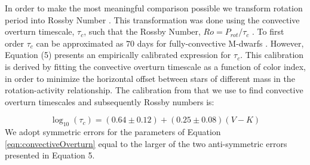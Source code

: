In order to make the most meaningful comparison possible we transform rotation
period into Rossby Number . This transformation was done using the convective
overturn timescale, $\tau_{c}$, such that the Rossby Number, $Ro =
P_{rot}/\tau_{c}$ . To first order $\tau_{c}$ can be approximated as $70$ days
for fully-convective M-dwarfs \citep{Pizzolato2000}. However, \citet{Wri18}
Equation (5) presents an empirically calibrated expression for $\tau_{c}$. This
calibration is derived by fitting the convective overturn timescale as a
function of color index, in order to minimize the horizontal offset between
stars of different mass in the rotation-activity relationship.  The calibration
from \citet{Wri18} that we use to find convective overturn timescales and
subsequently Rossby numbers is:

\begin{equation}\label{eqn:convectiveOverturn}
    \log_{10}(\tau_{c}) = (0.64\pm0.12)+(0.25\pm0.08)(V-K)
\end{equation}
We adopt symmetric errors for the parameters of Equation
\ref{eqn:convectiveOverturn} equal to the larger of the two anti-symmetric
errors presented in \citet{Wri18} Equation 5. 
